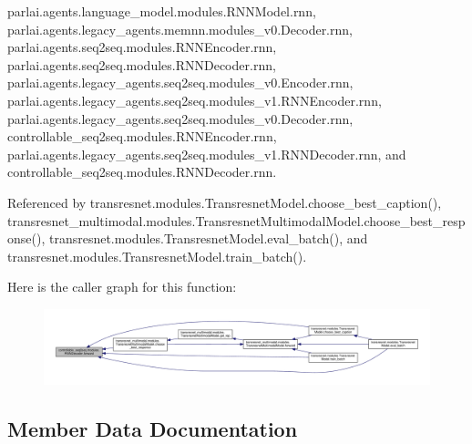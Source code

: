 parlai.\+agents.\+language\+\_\+model.\+modules.\+R\+N\+N\+Model.\+rnn, parlai.\+agents.\+legacy\+\_\+agents.\+memnn.\+modules\+\_\+v0.\+Decoder.\+rnn, parlai.\+agents.\+seq2seq.\+modules.\+R\+N\+N\+Encoder.\+rnn, parlai.\+agents.\+seq2seq.\+modules.\+R\+N\+N\+Decoder.\+rnn, parlai.\+agents.\+legacy\+\_\+agents.\+seq2seq.\+modules\+\_\+v0.\+Encoder.\+rnn, parlai.\+agents.\+legacy\+\_\+agents.\+seq2seq.\+modules\+\_\+v1.\+R\+N\+N\+Encoder.\+rnn, parlai.\+agents.\+legacy\+\_\+agents.\+seq2seq.\+modules\+\_\+v0.\+Decoder.\+rnn, controllable\+\_\+seq2seq.\+modules.\+R\+N\+N\+Encoder.\+rnn, parlai.\+agents.\+legacy\+\_\+agents.\+seq2seq.\+modules\+\_\+v1.\+R\+N\+N\+Decoder.\+rnn, and controllable\+\_\+seq2seq.\+modules.\+R\+N\+N\+Decoder.\+rnn.



Referenced by transresnet.\+modules.\+Transresnet\+Model.\+choose\+\_\+best\+\_\+caption(), transresnet\+\_\+multimodal.\+modules.\+Transresnet\+Multimodal\+Model.\+choose\+\_\+best\+\_\+response(), transresnet.\+modules.\+Transresnet\+Model.\+eval\+\_\+batch(), and transresnet.\+modules.\+Transresnet\+Model.\+train\+\_\+batch().

Here is the caller graph for this function\+:
\nopagebreak
\begin{figure}[H]
\begin{center}
\leavevmode
\includegraphics[width=350pt]{classcontrollable__seq2seq_1_1modules_1_1RNNDecoder_af72b9bf152e1c9fc931623af39723018_icgraph}
\end{center}
\end{figure}


\subsection{Member Data Documentation}
\mbox{\label{classcontrollable__seq2seq_1_1modules_1_1RNNDecoder_a06774cf88c306597d103ee623cf22224}} 
